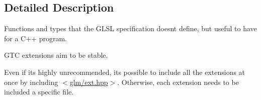 \subsection{Detailed Description}
Functions and types that the G\+L\+SL specification doesn\textquotesingle{}t define, but useful to have for a C++ program. 

G\+TC extensions aim to be stable.

Even if it\textquotesingle{}s highly unrecommended, it\textquotesingle{}s possible to include all the extensions at once by including $<$\hyperlink{ext_8hpp_source}{glm/ext.\+hpp}$>$. Otherwise, each extension needs to be included a specific file. 
